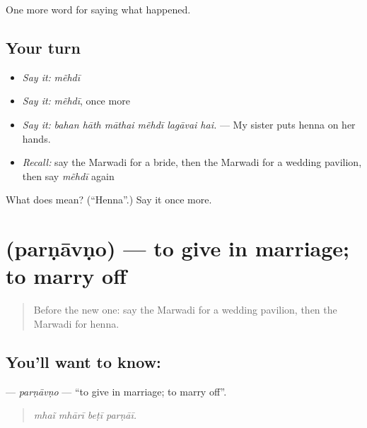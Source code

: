 \begin{grammarlens}[title={What you've built}]
One more word for saying what happened.
\end{grammarlens}

\subsection*{Your turn}
\begin{itemize}
\raggedright
  \item \emph{Say it:} \emph{mẽhdī}
  \item \emph{Say it:} \emph{mẽhdī}, once more
  \item \emph{Say it:} \emph{bahan hāth māthai mẽhdī lagāvai hai.} — My sister puts henna on her hands.
  \item \emph{Recall:} say the Marwadi for a bride, then the Marwadi for a wedding pavilion, then say \emph{mẽhdī} again
\end{itemize}

\begin{tcolorbox}[breakable,colback=teal!4,colframe=teal!35!black,title={Before you move on}]
What does  mean? (\textquotedblleft{}Henna\textquotedblright{}.) Say it once more.
\end{tcolorbox}
\section[\texorpdfstring{\mw{परणावणो} (parṇāvṇo)}{परणावणो (parṇāvṇo)}]{ (parṇāvṇo) — to give in marriage; to marry off}

\label{lesson:MW-C248-parnavno}



\begin{quote}
Before the new one: say the Marwadi for a wedding pavilion, then the Marwadi for henna.
\end{quote}

\subsection*{You'll want to know: }
\textbf{} — \emph{parṇāvṇo} — \textquotedblleft{}to give in marriage; to marry off\textquotedblright{}.

\begin{quote}
   
\end{quote}

\begin{quote}
\emph{mhaĩ mhārī beṭī parṇāī.}
\end{quote}

